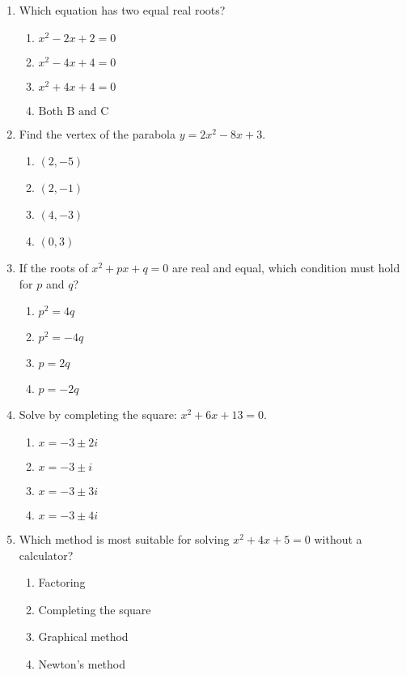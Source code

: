 \documentclass[12pt]{article}
\begin{document}
\begin{enumerate}
\item Which equation has two equal real roots?

\begin{enumerate}
  \item \(x^2 - 2x + 2 = 0\)
  \item \(x^2 - 4x + 4 = 0\)
  \item \(x^2 + 4x + 4 = 0\)
  \item \(\text{Both B and C}\)
\end{enumerate}

\item Find the vertex of the parabola \(y = 2x^2 - 8x + 3\).

\begin{enumerate}
  \item \((2,-5)\)
  \item \((2,-1)\)
  \item \((4,-3)\)
  \item \((0,3)\)
\end{enumerate}

\item If the roots of \(x^2 + px + q = 0\) are real and equal, which condition must hold for \(p\) and \(q\)?

\begin{enumerate}
  \item \(p^2 = 4q\)
  \item \(p^2 = -4q\)
  \item \(p = 2q\)
  \item \(p = -2q\)
\end{enumerate}

\item Solve by completing the square: \(x^2 + 6x + 13 = 0\).

\begin{enumerate}
  \item \(x = -3 \pm 2i\)
  \item \(x = -3 \pm i\)
  \item \(x = -3 \pm 3i\)
  \item \(x = -3 \pm 4i\)
\end{enumerate}

\item Which method is most suitable for solving \(x^2 + 4x + 5 = 0\) without a calculator?

\begin{enumerate}
  \item Factoring
  \item Completing the square
  \item Graphical method
  \item Newton's method
\end{enumerate}


\end{enumerate}
\end{document}
